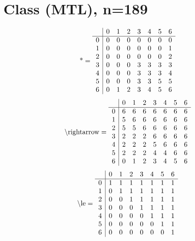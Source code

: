 \documentclass[11pt]{article}
\begin{document}
\section{Class (MTL), n=189}
\[\text{*} = 
\begin{array}{r | r r r r r r r}
 & 0 & 1 & 2 & 3 & 4 & 5 & 6 \\ \hline
0 & 0 & 0 & 0 & 0 & 0 & 0 & 0 \\
1 & 0 & 0 & 0 & 0 & 0 & 0 & 1 \\
2 & 0 & 0 & 0 & 0 & 0 & 0 & 2 \\
3 & 0 & 0 & 0 & 3 & 3 & 3 & 3 \\
4 & 0 & 0 & 0 & 3 & 3 & 3 & 4 \\
5 & 0 & 0 & 0 & 3 & 3 & 5 & 5 \\
6 & 0 & 1 & 2 & 3 & 4 & 5 & 6 \\
\end{array}
\]
\[\text{\textbackslash rightarrow} = 
\begin{array}{r | r r r r r r r}
 & 0 & 1 & 2 & 3 & 4 & 5 & 6 \\ \hline
0 & 6 & 6 & 6 & 6 & 6 & 6 & 6 \\
1 & 5 & 6 & 6 & 6 & 6 & 6 & 6 \\
2 & 5 & 5 & 6 & 6 & 6 & 6 & 6 \\
3 & 2 & 2 & 2 & 6 & 6 & 6 & 6 \\
4 & 2 & 2 & 2 & 5 & 6 & 6 & 6 \\
5 & 2 & 2 & 2 & 4 & 4 & 6 & 6 \\
6 & 0 & 1 & 2 & 3 & 4 & 5 & 6 \\
\end{array}
\]
\[\text{\textbackslash le} = 
\begin{array}{r | r r r r r r r}
 & 0 & 1 & 2 & 3 & 4 & 5 & 6 \\ \hline
0 & 1 & 1 & 1 & 1 & 1 & 1 & 1 \\
1 & 0 & 1 & 1 & 1 & 1 & 1 & 1 \\
2 & 0 & 0 & 1 & 1 & 1 & 1 & 1 \\
3 & 0 & 0 & 0 & 1 & 1 & 1 & 1 \\
4 & 0 & 0 & 0 & 0 & 1 & 1 & 1 \\
5 & 0 & 0 & 0 & 0 & 0 & 1 & 1 \\
6 & 0 & 0 & 0 & 0 & 0 & 0 & 1 \\
\end{array}
\]
\end{document}
